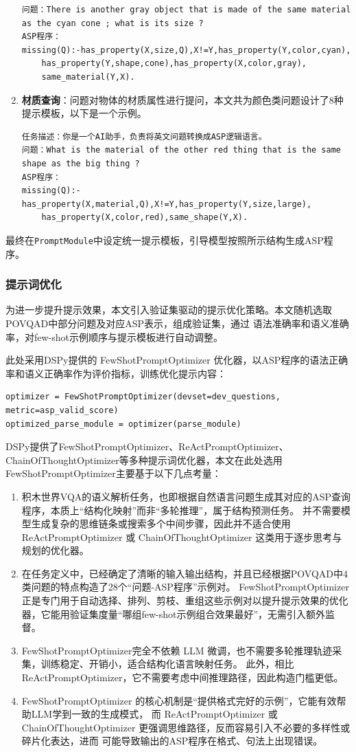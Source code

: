 \begin{enumerate}[nosep]
\begin{lstlisting}
问题：There is another gray object that is made of the same material as the cyan cone ; what is its size ? 
ASP程序：
missing(Q):-has_property(X,size,Q),X!=Y,has_property(Y,color,cyan),
    has_property(Y,shape,cone),has_property(X,color,gray),
    same_material(Y,X).
\end{lstlisting}
\item \textbf{材质查询}：问题对物体的材质属性进行提问，本文共为颜色类问题设计了8种提示模板，以下是一个示例。
\begin{lstlisting}
任务描述：你是一个AI助手，负责将英文问题转换成ASP逻辑语言。
问题：What is the material of the other red thing that is the same shape as the big thing ? 
ASP程序：
missing(Q):-has_property(X,material,Q),X!=Y,has_property(Y,size,large),
    has_property(X,color,red),same_shape(Y,X).
\end{lstlisting}
\end{enumerate}

最终在\texttt{PromptModule}中设定统一提示模板，引导模型按照所示结构生成ASP程序。
\subsubsection{提示词优化}
为进一步提升提示效果，本文引入验证集驱动的提示优化策略。本文随机选取POVQAD中部分问题及对应ASP表示，组成验证集，通过
语法准确率和语义准确率，对few-shot示例顺序与提示模板进行自动调整。

此处采用DSPy提供的 FewShotPromptOptimizer 优化器，以ASP程序的语法正确率和语义正确率作为评价指标，训练优化提示内容：
\begin{lstlisting}
optimizer = FewShotPromptOptimizer(devset=dev_questions, metric=asp_valid_score)
optimized_parse_module = optimizer(parse_module)
\end{lstlisting}

DSPy提供了FewShotPromptOptimizer、ReActPromptOptimizer、ChainOfThoughtOptimizer等多种提示词优化器，本文在此处选用
FewShotPromptOptimizer主要基于以下几点考量：
\begin{enumerate}[nosep]
\item 积木世界VQA的语义解析任务，也即根据自然语言问题生成其对应的ASP查询程序，本质上“结构化映射”而非“多轮推理”，属于结构预测任务。
并不需要模型生成复杂的思维链条或搜索多个中间步骤，因此并不适合使用 ReActPromptOptimizer 或 ChainOfThoughtOptimizer 这类用于逐步思考与规划的优化器。
\item 在任务定义中，已经确定了清晰的输入输出结构，并且已经根据POVQAD中4类问题的特点构造了28个“问题-ASP程序”示例对。
FewShotPromptOptimizer 正是专门用于自动选择、排列、剪枝、重组这些示例对以提升提示效果的优化器，它能用验证集度量“哪组few-shot示例组合效果最好”，无需引入额外监督。
\item FewShotPromptOptimizer完全不依赖 LLM 微调，也不需要多轮推理轨迹采集，训练稳定、开销小，适合结构化语言映射任务。
此外，相比 ReActPromptOptimizer，它不需要考虑中间推理路径，因此构造门槛更低。
\item FewShotPromptOptimizer 的核心机制是“提供格式完好的示例”，它能有效帮助LLM学到一致的生成模式，
而 ReActPromptOptimizer 或 ChainOfThoughtOptimizer 更强调思维路径，反而容易引入不必要的多样性或碎片化表达，进而
可能导致输出的ASP程序在格式、句法上出现错误。
\end{enumerate}

